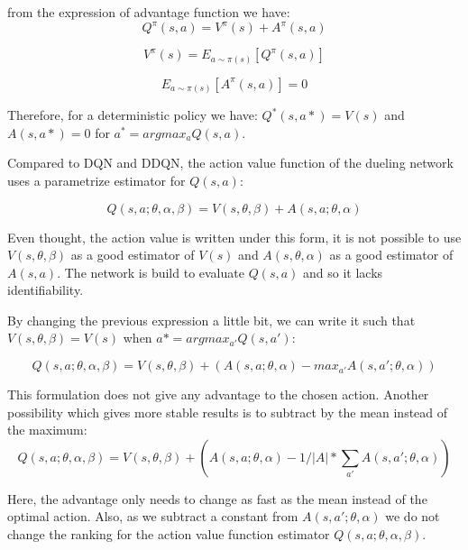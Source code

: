 \documentclass[12pt]{article}
\begin{document}
from the expression of advantage function we have:
\begin{equation}
	Q^{\pi}(s,a)=V^\pi (s) +A^\pi (s,a)
\end{equation}

\begin{equation}
	V^\pi (s)=E_{a \sim \pi(s)}[Q^\pi (s,a)]
\end{equation}

\begin{equation}
	E_{a \sim \pi(s)}[A^\pi (s,a)]=0
\end{equation}

Therefore, for a deterministic policy we have: $Q^*(s,a*)=V(s)$ and $A(s,a*)=0$ for $a^{*}=argmax_a Q(s,a)$.

Compared to DQN and DDQN, the action value function of the dueling network uses a parametrize estimator for $Q(s,a)$:

\begin{equation}
	Q(s,a;\theta,\alpha,\beta)=V(s,\theta,\beta) +A(s,a;\theta,\alpha)
\end{equation}

Even thought, the action value is written under this form, it is not possible to use $V(s,\theta,\beta)$ as a good estimator of $V(s)$ and $A(s,\theta,\alpha)$ as a good estimator of $A(s,a)$. 
The network is build to evaluate $Q(s,a)$ and so it lacks identifiability.

By changing the previous expression a little bit, we can write it such that $V(s,\theta,\beta)=V(s)$ when $a*=argmax_{a'}Q(s,a')$:

\begin{equation}
	Q(s,a;\theta,\alpha,\beta)=V(s,\theta,\beta) +(A(s,a;\theta,\alpha)-max_{a'}A(s,a';\theta,\alpha))
\end{equation}

This formulation does not give any advantage to the chosen action. 
Another possibility which gives more stable results is to subtract by the mean instead of the maximum:
\begin{equation}
	Q(s,a;\theta,\alpha,\beta)=V(s,\theta,\beta) +(A(s,a;\theta,\alpha)-1/{|A|}*\sum_{a'} A(s,a';\theta,\alpha))
\end{equation}

Here, the advantage only needs to change as fast as the mean instead of the optimal action. Also, as we subtract a constant from $A(s,a';\theta,\alpha)$ we do not change the ranking for the action value function estimator $Q(s,a;\theta,\alpha,\beta)$.
\end{document}
